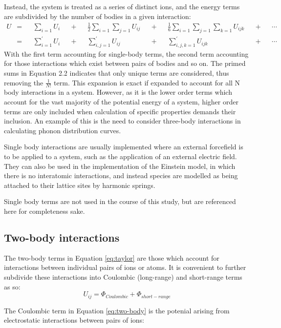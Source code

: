 Instead, the system is treated as a series of distinct ions, and the energy terms are subdivided by the number of bodies in a given interaction:\cite{Gale2003}
\begin{align}
U &=& &\sum_{i = 1} U_i&         &+& &\frac{1}{2}\sum_{i = 1} \sum_{j = 1} U_{ij}&  &+& &\frac{1}{6}\sum_{i = 1} \sum_{j = 1} \sum_{k = 1} U_{ijk}& &+& &\cdots\\
&=& &\sum_{i = 1}^\prime U_i&  &+& &\sum_{i,j = 1}^\prime U_{ij}&                 &+& &\sum_{i,j,k = 1}^\prime U_{ijk}&                           &+& &\cdots
\label{eq:taylor}
\end{align}
With the first term accounting for single-body terms, the second term accounting for those interactions which exist between pairs of bodies and so on.
The primed sums in Equation 2.2 indicates that only unique terms are considered, thus removing the $\frac{1}{N!}$ term.
This expansion is exact if expanded to account for all N body interactions in a system.
However, as it is the lower order terms which account for the vast majority of the potential energy of a system, higher order terms are only included when calculation of specific properties demands their inclusion. An example of this is the need to consider three-body interactions in calculating phonon distribution curves.

Single body interactions are usually implemented where an external forcefield is to be applied to a system, such as the application of an external electric field.
They can also be used in the implementation of the Einstein model, in which there is no interatomic interactions, and instead species are modelled as being attached to their lattice sites by harmonic springs.

Single body terms are not used in the course of this study, but are referenced here for completeness sake.

\newpage
\subsection{Two-body interactions}
The two-body terms in Equation \ref{eq:taylor} are those which account for interactions between individual pairs of ions or atoms. It is convenient to further subdivide these interactions into Coulombic (long-range) and short-range terms as so:
\begin{equation}
U_{ij} = \Phi_{Coulombic} + \Phi_{short-range}
\label{eq:two-body}
\end{equation}

The Coulombic term in Equation \ref{eq:two-body} is the potenial arising from electrostatic interactions between pairs of ions:

